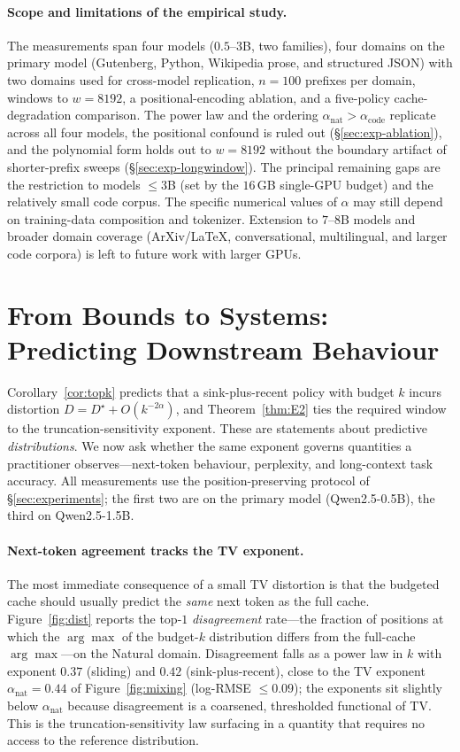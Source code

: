 \documentclass[11pt]{article}
\theoremstyle{plain}
\theoremstyle{definition}
\theoremstyle{remark}
\begin{document}
\paragraph{Scope and limitations of the empirical study.}
The measurements span four models ($0.5$--$3$B, two families), four
domains on the primary model (Gutenberg, Python, Wikipedia prose, and
structured JSON) with two domains used for cross-model replication,
$n = 100$ prefixes per domain, windows to $w = 8192$, a
positional-encoding ablation, and a five-policy cache-degradation
comparison. The power law and the ordering
$\alpha_{\text{nat}} > \alpha_{\text{code}}$ replicate across all
four models, the positional confound is ruled out
(\S\ref{sec:exp-ablation}), and the polynomial form holds out to
$w = 8192$ without the boundary artifact of shorter-prefix sweeps
(\S\ref{sec:exp-longwindow}). The principal remaining gaps are the
restriction to models $\le 3$B (set by the $16$\,GB single-GPU
budget) and the relatively small code corpus. The specific numerical
values of $\alpha$ may still depend on training-data composition and
tokenizer. Extension to $7$--$8$B models and broader domain coverage
(ArXiv/LaTeX, conversational, multilingual, and larger code corpora)
is left to future work with larger GPUs.

\section{From Bounds to Systems: Predicting Downstream Behaviour}
\label{sec:systems}

Corollary~\ref{cor:topk} predicts that a sink-plus-recent policy with
budget $k$ incurs distortion $D = D^\star + O(k^{-2\alpha})$, and
Theorem~\ref{thm:E2} ties the required window to the
truncation-sensitivity exponent. These are statements about predictive
\emph{distributions}. We now ask whether the same exponent governs
quantities a practitioner observes---next-token behaviour, perplexity,
and long-context task accuracy. All measurements use the
position-preserving protocol of \S\ref{sec:experiments}; the first two
are on the primary model (Qwen2.5-0.5B), the third on Qwen2.5-1.5B.

\paragraph{Next-token agreement tracks the TV exponent.}
The most immediate consequence of a small TV distortion is that the
budgeted cache should usually predict the \emph{same} next token as the
full cache. Figure~\ref{fig:dist} reports the top-$1$ \emph{disagreement}
rate---the fraction of positions at which the $\arg\max$ of the
budget-$k$ distribution differs from the full-cache $\arg\max$---on the
Natural domain. Disagreement falls as a power law in $k$ with exponent
$0.37$ (sliding) and $0.42$ (sink-plus-recent), close to the TV exponent
$\alpha_{\text{nat}} = 0.44$ of Figure~\ref{fig:mixing} (log-RMSE
$\le 0.09$); the exponents sit slightly below $\alpha_{\text{nat}}$
because disagreement is a coarsened, thresholded functional of TV. This
is the truncation-sensitivity law surfacing in a quantity that requires
no access to the reference distribution.
\end{document}
